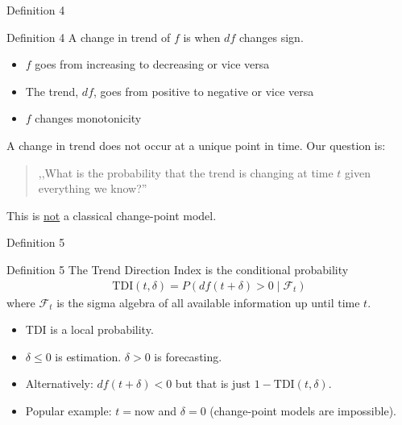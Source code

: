 \documentclass[ignorenonframetext,xcolor=pdflatex,table,dvipsnames,serif]{beamer}
\begin{document}
\begin{frame}{Definition 4}
\begin{alertblock}{Definition 4}
  A \alert{change in trend} of $f$ is when $df$ changes sign.
  \begin{itemize}
    \item{$f$ goes from increasing to decreasing or vice versa}
	\item{The trend, $df$, goes from positive to negative or vice versa}
	\item{$f$ changes monotonicity}	
  \end{itemize}
  
  \pause
 
  \vspace{1cm}
  
  A change in trend does not occur at a unique point in time. Our question is:
  \begin{quotation}
	  ,,What is the \alert{probability} that the trend is changing at time $t$ given everything we know?''
  \end{quotation}
  
  \vspace{0.5cm}
  
  This is \underline{not} a classical change-point model.  
\end{alertblock}    
\end{frame}


\begin{frame}{Definition 5}
\begin{alertblock}{Definition 5}
  The \alert{Trend Direction Index} is the conditional probability
  \begin{align*}
    \mathrm{TDI}(t, \delta) = P(df(t + \delta) > 0 \mid \mathcal{F}_t)
  \end{align*}
  where $\mathcal{F}_t$ is the sigma algebra of all available information up until time $t$.
\end{alertblock}    

\pause

\vspace{0.5cm}
\begin{itemize}
	\item{TDI is a local probability.}
	\item{$\delta \leq 0$ is estimation. $\delta > 0$ is forecasting.}
	\item{Alternatively: $df(t + \delta) < 0$ but that is just $1 - \mathrm{TDI}(t, \delta)$.}
	\item{Popular example: $t = \mathrm{now}$ and $\delta = 0$ (change-point models are impossible).}
\end{itemize}
\end{frame}
\end{document}
